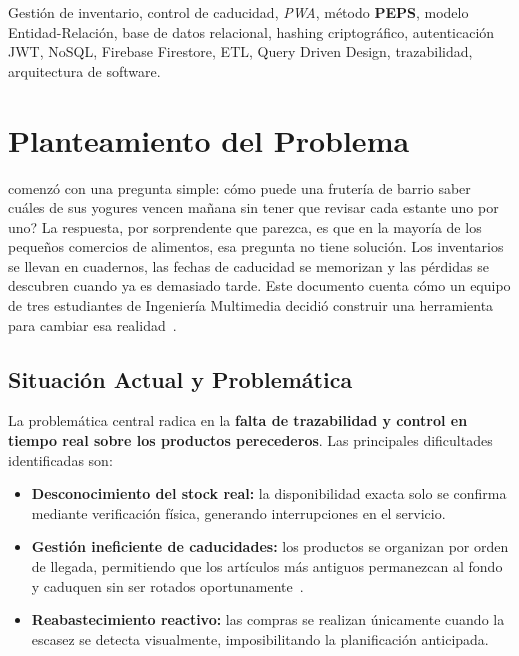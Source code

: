 \documentclass[journal]{IEEEtran}
\newcommand{\peps}{\textbf{PEPS}}
\newcommand{\pwa}{\textit{PWA}}
\begin{document}
	\begin{IEEEkeywords}
		Gesti\'{o}n de inventario, control de caducidad, \pwa{},
		m\'{e}todo \peps{}, modelo Entidad-Relaci\'{o}n, base de datos
		relacional, hashing criptogr\'{a}fico, autenticaci\'{o}n JWT,
		NoSQL, Firebase Firestore, ETL, Query Driven Design,
		trazabilidad, arquitectura de software.
	\end{IEEEkeywords}
	
	
	
	\section{Planteamiento del Problema}
	\label{sec:problema}
	
	 comenz\'{o} con una pregunta simple: c\'{o}mo
	puede una fruter\'{i}a de barrio saber cu\'{a}les de sus yogures vencen
	ma\~{n}ana sin tener que revisar cada estante uno por uno? La respuesta,
	por sorprendente que parezca, es que en la mayor\'{i}a de los peque\~{n}os
	comercios de alimentos, esa pregunta no tiene soluci\'{o}n. Los
	inventarios se llevan en cuadernos, las fechas de caducidad se memorizan
	y las p\'{e}rdidas se descubren cuando ya es demasiado tarde. Este
	documento cuenta c\'{o}mo un equipo de tres estudiantes de Ingenier\'{i}a
	Multimedia decidi\'{o} construir una herramienta para cambiar esa
	realidad~\cite{FAO:2019}.
	
	\subsection{Situaci\'{o}n Actual y Problem\'{a}tica}
	\label{subsec:situacion}
	
	La problem\'{a}tica central radica en la \textbf{falta de trazabilidad
		y control en tiempo real sobre los productos perecederos}.
	Las principales dificultades identificadas son:
	
	\begin{itemize}[leftmargin=*, label=\textbullet, itemsep=2pt]
		\item \textbf{Desconocimiento del stock real:} la disponibilidad
		exacta solo se confirma mediante verificaci\'{o}n f\'{i}sica,
		generando interrupciones en el servicio.
		
		\item \textbf{Gesti\'{o}n ineficiente de caducidades:} los productos
		se organizan por orden de llegada, permitiendo que los
		art\'{i}culos m\'{a}s antiguos permanezcan al fondo y caduquen
		sin ser rotados oportunamente~\cite{Probst:2018}.
		
		\item \textbf{Reabastecimiento reactivo:} las compras se realizan
		\'{u}nicamente cuando la escasez se detecta visualmente,
		imposibilitando la planificaci\'{o}n anticipada.
	\end{itemize}
	
\end{document}
